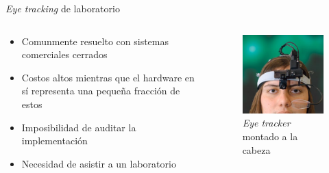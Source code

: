 \documentclass[aspectratio=169]{beamer}
\begin{document}
\begin{frame}{\textit{Eye tracking} de laboratorio}
  \begin{columns}
    \begin{column}{0.5\textwidth}
      \begin{itemize}
        \item Comunmente resuelto con sistemas comerciales cerrados
        \item Costos altos mientras que el hardware en sí representa una
          pequeña fracción de estos
        \item Imposibilidad de auditar la implementación
        \item Necesidad de asistir a un laboratorio
      \end{itemize}
    \end{column}

    \begin{column}{0.5\textwidth}
      \begin{figure}
        \centering
        \includegraphics[width=0.8\linewidth]{img/eye-tracker-head-mounted.jpg}
        \caption{\textit{Eye tracker} montado a la cabeza}
      \end{figure}
    \end{column}
  \end{columns}
\end{frame}
\end{document}
